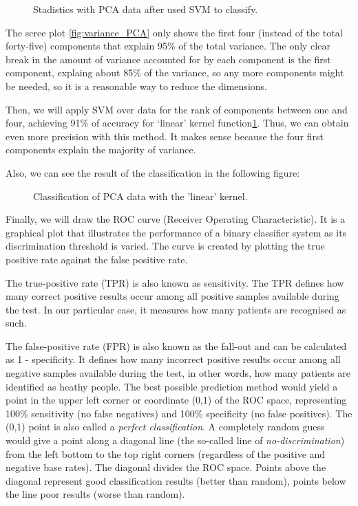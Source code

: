 \begin{figure}[H]
	\centering
	\caption{Stadistics with PCA data after used SVM to classify.}
	\label{fig:stadistics_PCA}
	\end{figure}
The scree plot \ref{fig:variance_PCA} only shows the first four (instead of the total forty-five) components that explain 95\% of the total variance. The only clear break in the amount of variance accounted for by each component is the first component, explaing about 85\% of the variance, so any more components might be needed, so it is  a reasonable way to reduce the dimensions.

Then, we will apply SVM over data for the rank of components between one and four, achieving 91\% of accuracy for ‘linear’ kernel function\ref{fig:stadistics_PCA}. Thus, we can obtain even more precision with this method. It makes sense because the four first components explain the majority of variance.

Also, we can see the result of the classification in the following figure:

\begin{figure}[H]
	\centering
	\caption{Classification of PCA data with the 'linear' kernel.}
	\label{fig:Classification3D_PCA}
\end{figure}

Finally, we will draw the ROC curve (Receiver Operating Characteristic). It  is a graphical plot that illustrates the performance of a binary classifier system as its discrimination threshold is varied. The curve is created by plotting the true positive rate against the false positive rate\cite{ROC1}.

The true-positive rate (TPR) is also known as sensitivity. The TPR defines how many correct positive results occur among all positive samples available during the test. In our particular case, it measures how many patients are recognised as such.

The false-positive rate (FPR) is also known as the fall-out and can be calculated as 1 - specificity. It defines how many incorrect positive results occur among all negative samples available during the test, in other words, how many patients are identified as heathy people.
The best possible prediction method would yield a point in the upper left corner or coordinate (0,1) of the ROC space, representing 100\% sensitivity (no false negatives) and 100\% specificity (no false positives). The (0,1) point is also called a \textit{perfect classification}. A completely random guess would give a point along a diagonal line (the so-called line of \textit{no-discrimination}) from the left bottom to the top right corners (regardless of the positive and negative base rates). The diagonal divides the ROC space. Points above the diagonal represent good classification results (better than random), points below the line poor results (worse than random)\cite{ROC1}.

